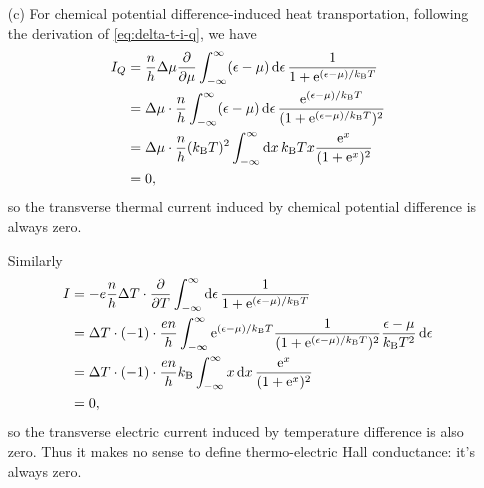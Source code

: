 \documentclass[hyperref, a4paper]{article}
\newcommand*{\ee}{\mathrm{e}}
\begin{document}
\begin{itemize}
\item[(c)] For chemical potential difference-induced heat transportation,
following the derivation of \eqref{eq:delta-t-i-q}, we have 
\begin{equation}
    \begin{aligned}
        I_Q &= \frac{n}{h} \Delta \mu \pdv{\mu} \int^\infty_{-\infty} (\epsilon - \mu) \dd{\epsilon} 
        \frac{1}{1 + \ee^{(\epsilon - \mu) / k_{\text{B}} T}} \\
        &= \Delta \mu \cdot \frac{n}{h} \int^\infty_{-\infty} (\epsilon - \mu) \dd{\epsilon}
        \frac{\ee^{(\epsilon - \mu) / k_{\text{B}} T}}{(1 + \ee^{(\epsilon - \mu) / k_{\text{B}} T})^2} \\
        &= \Delta \mu \cdot \frac{n}{h} (k_{\text{B}} T)^2 \int^\infty_{-\infty} \dd{x}
        k_{\text{B}} T x \frac{\ee^x}{(1 + \ee^x)^2} \\
        &= 0,
    \end{aligned}
\end{equation}
so the transverse thermal current induced by chemical potential difference is always zero.

Similarly 
\begin{equation}
    \begin{aligned}
        I &= - e \frac{n}{h} \Delta T \cdot \pdv{T} \int^\infty_{-\infty} \dd{\epsilon} \frac{1}{1 + \ee^{(\epsilon - \mu) / k_{\text{B}} T}} \\
        &= \Delta T \cdot (-1) \cdot \frac{en}{h} \int^\infty_{-\infty} 
        \ee^{(\epsilon - \mu) / k_{\text{B}} T} 
        \frac{1}{(1 + \ee^{(\epsilon - \mu) / k_{\text{B}} T})^2}
        \frac{\epsilon - \mu}{k_{\text{B}} T^2} \dd{\epsilon} \\
        &= \Delta T \cdot (-1) \cdot \frac{en}{h} k_{\text{B}} \int^\infty_{-\infty} x \dd{x} 
        \frac{\ee^x}{(1 + \ee^x)^2} \\
        &= 0,
    \end{aligned}
\end{equation}
so the transverse electric current induced by temperature difference is also zero.
Thus it makes no sense to define thermo-electric Hall conductance:
it's always zero.

\end{itemize}
\end{document}
